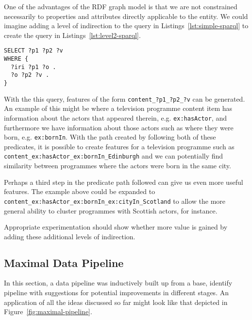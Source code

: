 One of the advantages of the RDF graph model is that we are not constrained
necessarily to properties and attributes directly applicable to the entity. We
could imagine adding a level of indirection to the query in
Listings~\ref{lst:simple-sparql} to create the query in
Listings~\ref{lst:level2-sparql}.


\begin{lstlisting}[label=lst:level2-sparql,caption={Generates field \texttt{content\_?p1\_?p2\_?v} with value \texttt{true}},language=sparql]
SELECT ?p1 ?p2 ?v
WHERE {
  ?iri ?p1 ?o .
  ?o ?p2 ?v .
}
\end{lstlisting}

With the this query, features of the form \texttt{content\_?p1\_?p2\_?v} can
be generated. An example of this might be where a television programme
content item has information about the actors that appeared therein, e.g.
\texttt{ex:hasActor}, and furthermore we have information about those actors
such as where they were born, e.g. \texttt{ex:bornIn}. With the path created
by following both of these predicates, it is possible to create features for
a television programme such as
\texttt{content\_ex:hasActor\_ex:bornIn\_Edinburgh} and we can potentially
find similarity between programmes where the actors were born in the same
city.

Perhaps a third step in the predicate path followed can give us even more
useful features. The example above could be expanded to
\texttt{content\_ex:hasActor\_ex:bornIn\_ex:cityIn\_Scotland} to allow the
more general ability to cluster programmes with Scottish actors, for instance.

Appropriate experimentation should show whether more value is gained by
adding these additional levels of indirection.

\subsection{Maximal Data Pipeline}

In this section, a data pipeline was inductively built up from a base,
identify pipeline with suggestions for potential improvements in different
stages. An application of all the ideas discussed so far might look like
that depicted in Figure~\ref{fig:maximal-pipeline}.

